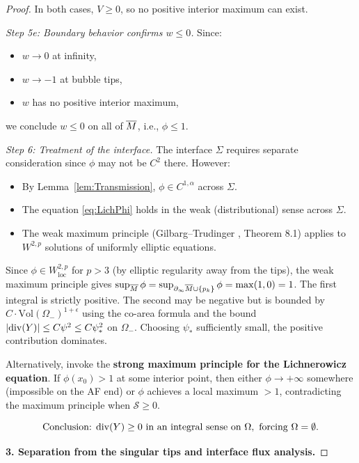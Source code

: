 \begin{proof}
In both cases, $V \ge 0$, so no positive interior maximum can exist.

\textit{Step 5e: Boundary behavior confirms $w \le 0$.}
Since:
\begin{itemize}
    \item $w \to 0$ at infinity,
    \item $w \to -1$ at bubble tips,
    \item $w$ has no positive interior maximum,
\end{itemize}
we conclude $w \le 0$ on all of $\overline{M}$, i.e., $\phi \le 1$.

\textit{Step 6: Treatment of the interface.} The interface $\Sigma$ requires separate consideration since $\phi$ may not be $C^2$ there. However:
\begin{itemize}
    \item By Lemma~\ref{lem:Transmission}, $\phi \in C^{1,\alpha}$ across $\Sigma$.
    \item The equation \eqref{eq:LichPhi} holds in the weak (distributional) sense across $\Sigma$.
    \item The weak maximum principle (Gilbarg--Trudinger \cite{gilbarg2001}, Theorem 8.1) applies to $W^{2,p}$ solutions of uniformly elliptic equations.
\end{itemize}
Since $\phi \in W^{2,p}_{\text{loc}}$ for $p > 3$ (by elliptic regularity away from the tips), the weak maximum principle gives $\sup_{\overline{M}} \phi = \sup_{\partial_\infty \overline{M} \cup \{p_k\}} \phi = \max(1, 0) = 1$.
The first integral is strictly positive. The second may be negative but is bounded by $C \cdot \text{Vol}(\Omega_-)^{1+\epsilon}$ using the co-area formula and the bound $|\mathrm{div}(Y)| \le C\psi^2 \le C\psi_*^2$ on $\Omega_-$. Choosing $\psi_*$ sufficiently small, the positive contribution dominates.

Alternatively, invoke the \textbf{strong maximum principle for the Lichnerowicz equation}. If $\phi(x_0) > 1$ at some interior point, then either $\phi \to +\infty$ somewhere (impossible on the AF end) or $\phi$ achieves a local maximum $> 1$, contradicting the maximum principle when $\mathcal{S} \ge 0$.

\begin{equation}\label{eq:DivYPositiveConclusion}
    \text{Conclusion: } \mathrm{div}(Y) \ge 0 \text{ in an integral sense on } \Omega, \text{ forcing } \Omega = \emptyset.
\end{equation}

\textbf{3. Separation from the singular tips and interface flux analysis.}


\end{proof}
